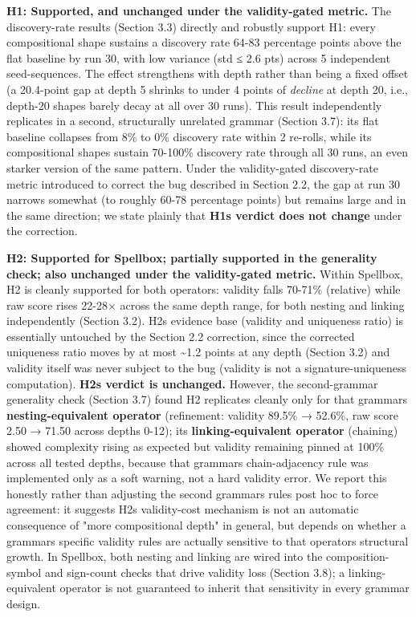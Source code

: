 \documentclass[
  10pt,
  twocolumn]{article}
\begin{document}
\textbf{H1: Supported, and unchanged under the validity-gated metric.}
The discovery-rate results (Section 3.3) directly and robustly support
H1: every compositional shape sustains a discovery rate 64-83 percentage
points above the flat baseline by run 30, with low variance (std ≤ 2.6
pts) across 5 independent seed-sequences. The effect strengthens with
depth rather than being a fixed offset (a 20.4-point gap at depth 5
shrinks to under 4 points of \emph{decline} at depth 20, i.e., depth-20
shapes barely decay at all over 30 runs). This result independently
replicates in a second, structurally unrelated grammar (Section 3.7):
its flat baseline collapses from 8\% to 0\% discovery rate within 2
re-rolls, while its compositional shapes sustain 70-100\% discovery rate
through all 30 runs, an even starker version of the same pattern. Under
the validity-gated discovery-rate metric introduced to correct the bug
described in Section 2.2, the gap at run 30 narrows somewhat (to roughly
60-78 percentage points) but remains large and in the same direction; we
state plainly that \textbf{H1\textquotesingle s verdict does not change}
under the correction.

\textbf{H2: Supported for Spellbox; partially supported in the
generality check; also unchanged under the validity-gated metric.}
Within Spellbox, H2 is cleanly supported for both operators: validity
falls 70-71\% (relative) while raw score rises 22-28× across the same
depth range, for both nesting and linking independently (Section 3.2).
H2\textquotesingle s evidence base (validity and uniqueness ratio) is
essentially untouched by the Section 2.2 correction, since the corrected
uniqueness ratio moves by at most \textasciitilde1.2 points at any depth
(Section 3.2) and validity itself was never subject to the bug (validity
is not a signature-uniqueness computation). \textbf{H2\textquotesingle s
verdict is unchanged.} However, the second-grammar generality check
(Section 3.7) found H2 replicates cleanly only for that
grammar\textquotesingle s \textbf{nesting-equivalent operator}
(refinement: validity 89.5\% → 52.6\%, raw score 2.50 → 71.50 across
depths 0-12); its \textbf{linking-equivalent operator} (chaining) showed
complexity rising as expected but validity remaining pinned at 100\%
across all tested depths, because that grammar\textquotesingle s
chain-adjacency rule was implemented only as a soft warning, not a hard
validity error. We report this honestly rather than adjusting the second
grammar\textquotesingle s rules post hoc to force agreement: it suggests
H2\textquotesingle s validity-cost mechanism is not an automatic
consequence of "more compositional depth" in general, but depends on
whether a grammar\textquotesingle s specific validity rules are actually
sensitive to that operator\textquotesingle s structural growth. In
Spellbox, both nesting and linking are wired into the composition-symbol
and sign-count checks that drive validity loss (Section 3.8); a
linking-equivalent operator is not guaranteed to inherit that
sensitivity in every grammar design.
\end{document}
